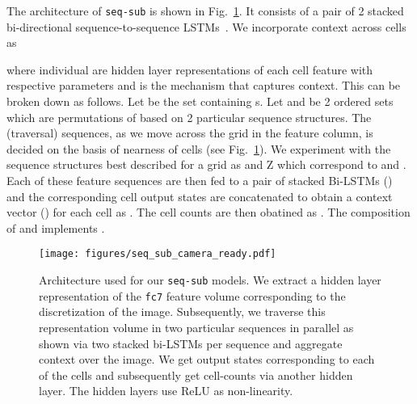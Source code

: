 \documentclass[10pt,twocolumn,letterpaper]{article}
\newcommand{\seq}{\texttt{seq-sub}\xspace}
\begin{document}
\par \noindent
The architecture of \seq{} is shown in Fig.~\ref{fig:seqsub}. It consists of a pair of 2 stacked bi-directional sequence-to-sequence LSTMs~\cite{Schuster1997BidirectionalRN}. We incorporate context across cells as 

where individual  are hidden layer representations of each cell feature with respective parameters and  is the mechanism that captures context. This can be broken down as follows. Let  be the set containing s. Let  and  be 2 ordered sets which are permutations of  based on 2 particular sequence structures. The (traversal) sequences, as we move across the grid in the feature column, is decided on the basis of nearness of cells  (see Fig.~\ref{fig:seqsub}). We experiment with the sequence structures best described for a  grid as  and Z which correspond to  and . Each of these feature sequences are then fed to a pair of stacked Bi-LSTMs () and the corresponding cell output states are concatenated to obtain a context vector () for each cell as . The cell counts are then obatined as . The composition of  and  implements .




\begin{comment}
\subsection{Counting by Detection}
\begin{itemize}
\item Explain what Fast-RCNN does briefly
\item mention the detection pipeline
\item explain how we tune the detector to generate better counts
\item NMS threshold and count threshold
\item show an example where the difference between thresholds is apparent
\end{itemize}
\end{comment}



\begin{figure}
\texttt{[image: figures/seq\_sub\_camera\_ready.pdf]}
\vspace{-25pt}
\caption{\footnotesize{Architecture used for our \seq{} models. We extract a hidden layer representation of the \texttt{fc7} feature volume corresponding to the  discretization of the image. Subsequently, we traverse this representation volume in two particular sequences in parallel as shown via two stacked bi-LSTMs per sequence and aggregate context over the image. We get output states corresponding to each of the cells and subsequently get cell-counts via another hidden layer. The hidden layers use ReLU as non-linearity.}}
\label{fig:seqsub}
\vspace{-17pt}
\end{figure}
\end{document}

